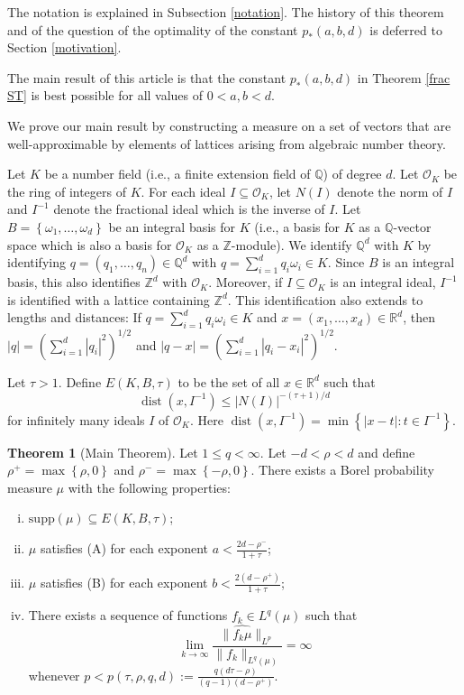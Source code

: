 \documentclass{amsart}
\numberwithin{equation}{section}
\theoremstyle{definition}
\newtheorem{thm}[theorem]{Theorem}
\theoremstyle{definition}
\def\RR{\mathbb{R}}
\def\QQ{\mathbb{Q}}
\def\ZZ{\mathbb{Z}}
\def\supp{\mathrm{supp}}
\newcommand{\rbr}[1]{\left( {#1} \right)}
\newcommand{\cbr}[1]{ \left\{ {#1} \right\} }
\newcommand{\OK}{\mathcal{O}_K}
\DeclareMathOperator{\dist}{dist}
\begin{document}
\noindent The notation is explained in Subsection \ref{notation}. The history of this theorem and of the question of the optimality of the constant $p_{*}(a,b,d)$ is deferred to Section \ref{motivation}. 

The main result of this article is that the constant $p_{*}(a,b,d)$ in Theorem \ref{frac ST} is best possible for all values of $0 < a,b < d$. 

We prove our main result by constructing a measure   
on a set of vectors that are well-approximable by elements of lattices arising from algebraic number theory. 

Let $K$ be a number field (i.e., a finite extension field of $\QQ$) of degree $d$. 
Let $\OK$ be the ring of integers of $K$.
For each ideal $I \subseteq \OK$, let $N(I)$ denote the norm of $I$ and $I^{-1}$ denote the fractional ideal which is the inverse of $I$. 
Let $B=\cbr{\omega_1,\ldots,\omega_{d}}$ be an integral basis for $K$ (i.e., a basis for $K$ as a $\QQ$-vector space which is also a basis for $\OK$ as a $\ZZ$-module). We identify $\mathbb{Q}^d$ with $K$ by identifying 
$q=(q_1,\ldots,q_n) \in \mathbb{Q}^d$ with 
$q=\sum_{i=1}^{d} q_i \omega_i \in K$. 
Since $B$ is an integral basis, 
this also identifies $\mathbb{Z}^d$ with $\OK$. 
Moreover, if $I \subseteq \OK$ is an integral ideal, $I^{-1}$ is identified with a lattice containing $\mathbb{Z}^d$. 
This identification also extends to lengths and distances:  
If $q=\sum_{i=1}^d q_i \omega_i \in K$ 
and $x = (x_1,\ldots,x_d) \in \RR^d$, 
then 
$|q| = \rbr{\sum_{i=1}^d |q_i|^2}^{1/2}$  
and $|q-x| = \rbr{\sum_{i=1}^d |q_i-x_i|^2}^{1/2}$. 


Let $\tau > 1$. Define 
$E(K,B,\tau)$ to be the set of all $x \in \RR^d$ such that 
$$
\dist(x, I^{-1}) \leq |N(I)|^{-(\tau+1)/d} 
$$
for infinitely many ideals $I$ of $\OK$.
Here 
$
\dist(x,I^{-1}) = \min\cbr{|x-t|: t \in I^{-1}}. 
$


\begin{thm}[Main Theorem]\label{mainthm3}
Let $1 \leq q < \infty$. 
Let $-d < \rho < d$ 
and define  
$
\rho^+ = \max\cbr{\rho,0}$ and $\rho^- = \max\cbr{-\rho,0}
$. 
There exists a Borel probability measure 
$\mu$ with the following properties: 
\begin{enumerate}[(i)]
    \item $\supp(\mu) \subseteq E(K, B, \tau)$; 
\item $\mu$ satisfies (A) for each exponent $a < \frac{2d  - \rho^-}{1 + \tau}$;
\item 
$\mu$ satisfies (B) for each  exponent $b < \frac{2(d-\rho^+)}{1 + \tau}$; 
\item There exists a sequence of functions $f_k \in L^q(\mu)$ such that
\[\lim_{k \to \infty} \frac{\|\widehat{f_k \mu}\|_{L^p}}{\|f_k\|_{L^q(\mu)}} = \infty\]
whenever $p < p(\tau, \rho, q, d) := \frac{q(d \tau - \rho)}{(q-1) (d-\rho^+)}$.
\end{enumerate}
\end{thm}
\end{document}
